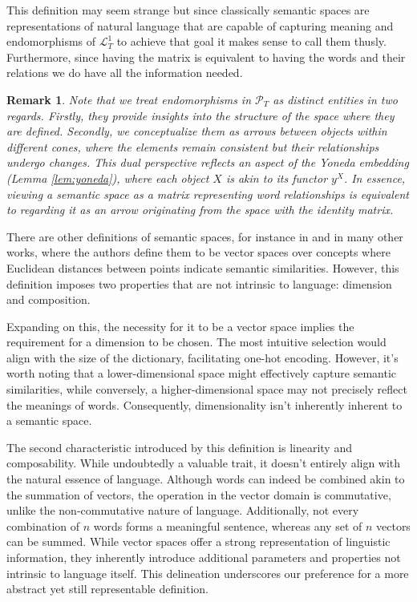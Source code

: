 \documentclass[10pt,a4paper]{elsarticle}
\renewcommand{\L}{\mathcal{L}}
\renewcommand{\P}{\mathcal{P}}
\newtheorem{re}[theorem]{Remark}
\begin{document}
This definition may seem strange but since classically semantic spaces are representations of natural language that are capable of capturing meaning and endomorphisms of $\L_{T}^{1}$ to achieve that goal it makes sense to call them thusly. Furthermore, since having the matrix is equivalent to having the words and their relations we do have all the information needed. 

\begin{re}
	Note that we treat endomorphisms in $ \P_{T} $ as distinct entities in two regards. Firstly, they provide insights into the structure of the space where they are defined. Secondly, we conceptualize them as arrows between objects within different cones, where the elements remain consistent but their relationships undergo changes. This dual perspective reflects an aspect of the Yoneda embedding (Lemma \ref{lem:yoneda}), where each object $ X $ is akin to its functor $ y^{X} $. In essence, viewing a semantic space as a matrix representing word relationships is equivalent to regarding it as an arrow originating from the space with the identity matrix. 
\end{re}


There are other definitions of semantic spaces, for instance in \cite{hashimoto2016word} and in many other works, where the authors define them to be vector spaces over concepts where Euclidean distances between points indicate semantic similarities. However, this definition imposes two properties that are not intrinsic to language: dimension and composition. 

Expanding on this, the necessity for it to be a vector space implies the requirement for a dimension to be chosen. The most intuitive selection would align with the size of the dictionary, facilitating one-hot encoding. However, it's worth noting that a lower-dimensional space might effectively capture semantic similarities, while conversely, a higher-dimensional space may not precisely reflect the meanings of words. Consequently, dimensionality isn't inherently inherent to a semantic space.

The second characteristic introduced by this definition is linearity and composability. While undoubtedly a valuable trait, it doesn't entirely align with the natural essence of language. Although words can indeed be combined akin to the summation of vectors, the operation in the vector domain is commutative, unlike the non-commutative nature of language. Additionally, not every combination of $n$ words forms a meaningful sentence, whereas any set of $n$ vectors can be summed. While vector spaces offer a strong representation of linguistic information, they inherently introduce additional parameters and properties not intrinsic to language itself. This delineation underscores our preference for a more abstract yet still representable definition.
\end{document}

